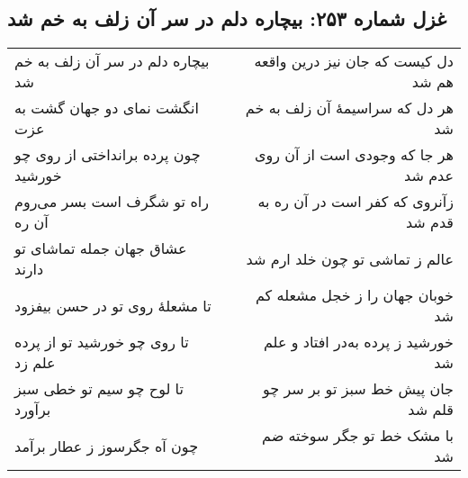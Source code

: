 \begin{center}
\section*{غزل شماره ۲۵۳: بیچاره دلم در سر آن زلف به خم شد}
\label{sec:253}
\begin{longtable}{l p{0.5cm} r}
بیچاره دلم در سر آن زلف به خم شد
&&
دل کیست که جان نیز درین واقعه هم شد
\\
انگشت نمای دو جهان گشت به عزت
&&
هر دل که سراسیمهٔ آن زلف به خم شد
\\
چون پرده برانداختی از روی چو خورشید
&&
هر جا که وجودی است از آن روی عدم شد
\\
راه تو شگرف است بسر می‌روم آن ره
&&
زآنروی که کفر است در آن ره به قدم شد
\\
عشاق جهان جمله تماشای تو دارند
&&
عالم ز تماشی تو چون خلد ارم شد
\\
تا مشعلهٔ روی تو در حسن بیفزود
&&
خوبان جهان را ز خجل مشعله کم شد
\\
تا روی چو خورشید تو از پرده علم زد
&&
خورشید ز پرده به‌در افتاد و علم شد
\\
تا لوح چو سیم تو خطی سبز برآورد
&&
جان پیش خط سبز تو بر سر چو قلم شد
\\
چون آه جگرسوز ز عطار برآمد
&&
با مشک خط تو جگر سوخته ضم شد
\\
\end{longtable}
\end{center}
